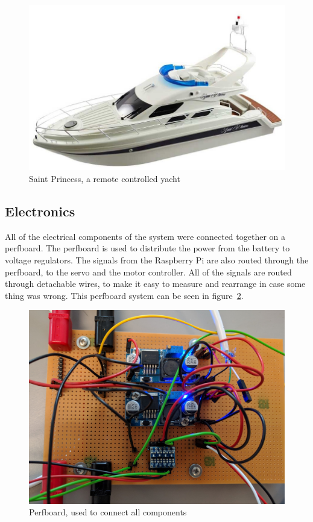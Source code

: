 \begin{figure}[h]
\centering
\includegraphics[width=0.7\linewidth]{../Appendix/Project/Dokumentation/Images/Design/saint_princess}
\caption{Saint Princess, a remote controlled yacht \cite{saint_princess}}
\label{fig:saintprincess}
\end{figure}

\subsection{Electronics}
All of the electrical components of the system were connected together on a perfboard\cite{perfboard}. The perfboard is used to distribute the power from the battery to voltage regulators. The signals from the Raspberry Pi are also routed through the perfboard, to the servo and the motor controller. All of the signals are routed through detachable wires, to make it easy to measure and rearrange in case some thing was wrong. This perfboard system can be seen in figure~\ref{fig:integration}. 

\begin{figure}[h]
\centering
\includegraphics[width=0.7\linewidth]{../Appendix/Project/Dokumentation/Images/Implementation/integration}
\caption{Perfboard, used to connect all components}
\label{fig:integration}
\end{figure}

